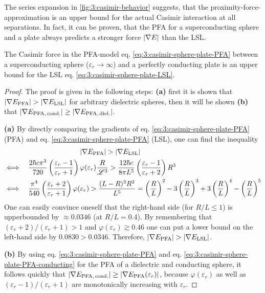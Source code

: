 The series expansion in \cref{fig:3:casimir-behavior} suggests, that the proximity-force-approximation is an upper bound for the actual Casimir interaction at all separations. In fact, it can be proven, that the PFA for a superconducting sphere and a plate always predicts a stronger force $\left\lvert\nabla E\right\rvert$ than the LSL.
\begin{theorem}
  The Casimir force in the PFA-model eq. \eqref{eq:3:casimir-sphere-plate-PFA} between a superconducting sphere ($\varepsilon_r \rightarrow \infty$) and a perfectly conducting plate is an upper bound for the LSL eq. \eqref{eq:3:casimir-sphere-plate-LSL}.
\end{theorem}
\begin{proof}
  The proof is given in the following steps: \textbf{(a)} first it is shown that $\left\lvert\nabla E_\mathrm{PFA}\right\rvert > \left\lvert\nabla E_\mathrm{LSL}\right\rvert$ for arbitrary dielectric spheres, then it will be shown \textbf{(b)} that $\left\lvert\nabla E_\mathrm{PFA,\,cond.}\right\rvert \geq \left\lvert\nabla E_\mathrm{PFA,\,diel.}\right\rvert$.

  \textbf{(a)} By directly comparing the gradients of eq. \eqref{eq:3:casimir-sphere-plate-PFA} (PFA) and eq. \eqref{eq:3:casimir-sphere-plate-PFA} (LSL),  one can find
  the inequality
  \begin{align*}
    &\qquad\qquad\qquad\qquad\qquad\ \ \left\lvert\nabla E_\mathrm{PFA}\right\rvert > \left\lvert\nabla E_\mathrm{LSL}\right\rvert \\
    &\Longleftrightarrow \quad  \frac{2\hbar c \pi^3}{720}\left(\frac{\varepsilon_r - 1}{\varepsilon_r + 1}\right)\varphi(\varepsilon_r)\frac{R}{\mathscr{L}^3} > \frac{12 \hbar c}{8\pi L^5}\left(\frac{\varepsilon_r - 1}{\varepsilon_r + 2}\right)R^3 \\
    &\Longleftrightarrow \quad \frac{\pi^4}{540}\left(\frac{\varepsilon_r + 2}{\varepsilon_r + 1}\right)\varphi(\varepsilon_r) > \frac{(L-R)^3 R^2}{L^5} = \left(\frac{R}{L}\right)^2 - 3\left(\frac{R}{L}\right)^3 + 3\left(\frac{R}{L}\right)^4 - \left(\frac{R}{L}\right)^5
  \end{align*}
  One can easily convince oneself that the right-hand side (for $R/L \leq 1$) is upperbounded by $\approx 0.0346$ (at $R/L = 0.4$). By remembering that $(\varepsilon_r + 2)/(\varepsilon_r + 1) > 1$ and $\varphi(\varepsilon_r) \gtrsim 0.46$ one can put a lower bound on the left-hand side by $0.0830 > 0.0346$. Therefore, $\left\lvert\nabla E_\mathrm{PFA}\right\rvert > \left\lvert\nabla E_\mathrm{LSL}\right\rvert$.

  \textbf{(b)} By using eq. \eqref{eq:3:casimir-sphere-plate-PFA} and eq. \eqref{eq:3:casimir-sphere-plate-PFA-conducting} for the PFA of a dielectric and conducting sphere, it follows quickly that $\left\lvert\nabla E_\mathrm{PFA,\,cond.}\right\rvert \geq \left\lvert\nabla E_\mathrm{PFA}(\varepsilon_r)\right\rvert$, because $\varphi(\varepsilon_r)$ as well as $(\varepsilon_r - 1)/(\varepsilon_r + 1)$ are monotonically increasing with $\varepsilon_r$. 


\end{proof}
